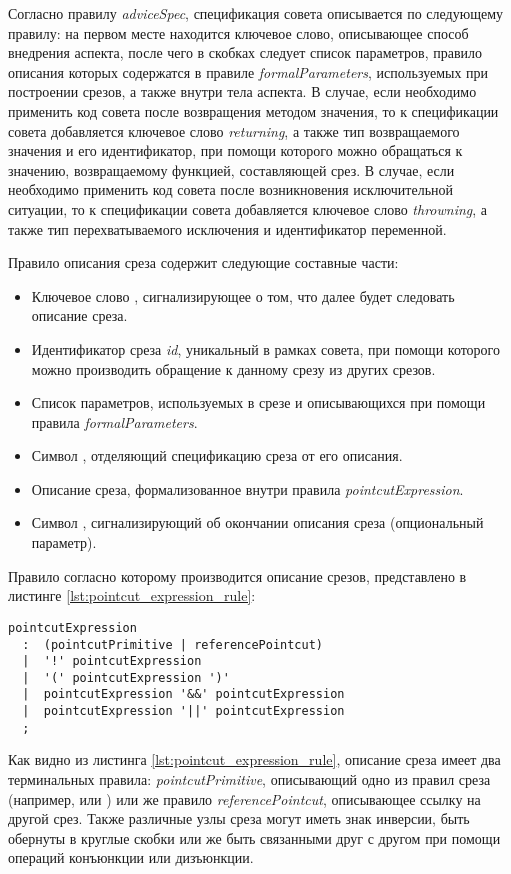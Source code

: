Согласно правилу \textit{adviceSpec}, спецификация совета описывается по
следующему правилу: на первом месте находится ключевое слово, описывающее
способ внедрения аспекта, после чего в скобках следует список параметров, правило описания которых содержатся в правиле \textit{formalParameters},
используемых при построении срезов, а также внутри тела аспекта.
В случае, если необходимо применить код совета после возвращения методом
значения, то к спецификации совета добавляется ключевое слово
\textit{returning}, а также тип возвращаемого значения и его идентификатор, при
помощи которого можно обращаться к значению, возвращаемому функцией,
составляющей срез.
В случае, если необходимо применить код совета после возникновения
исключительной ситуации, то к спецификации совета добавляется ключевое слово
\textit{throwning}, а также тип перехватываемого исключения и идентификатор переменной.

Правило описания среза содержит следующие составные части:
\begin{itemize}
	\item Ключевое слово , сигнализирующее о том, что далее
		  будет следовать описание среза.
	\item Идентификатор среза \textit{id}, уникальный в рамках совета, при
		  помощи которого можно производить обращение к данному срезу из других
		  срезов.
	\item Список параметров, используемых в срезе и описывающихся при помощи
		  правила \textit{formalParameters}.
	\item Символ \quotes{:}, отделяющий спецификацию среза от его описания.
	\item Описание среза, формализованное внутри правила
		  \textit{pointcutExpression}.
	\item Символ \quotes{;}, сигнализирующий об окончании описания среза
		  (опциональный параметр).
\end{itemize}

Правило согласно которому производится описание срезов, представлено в листинге
\ref{lst:pointcut_expression_rule}:
\begin{lstlisting}[style={java}, label={lst:pointcut_expression_rule},
  caption={Правило описания среза pointcutExpression}]
pointcutExpression
  :  (pointcutPrimitive | referencePointcut)
  |  '!' pointcutExpression
  |  '(' pointcutExpression ')'
  |  pointcutExpression '&&' pointcutExpression
  |  pointcutExpression '||' pointcutExpression
  ;
\end{lstlisting}
Как видно из листинга \ref{lst:pointcut_expression_rule}, описание среза имеет
два терминальных правила: \textit{pointcutPrimitive}, описывающий одно из
правил среза (например,  или ) или же правило
\textit{referencePointcut}, описывающее ссылку на другой срез.
Также различные узлы среза могут иметь знак инверсии, быть обернуты в круглые
скобки или же быть связанными друг с другом при помощи операций конъюнкции или
дизъюнкции.
